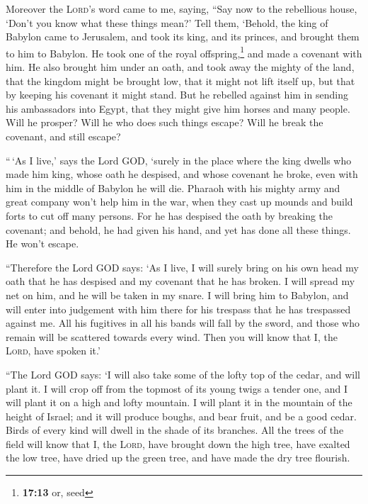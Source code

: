  Moreover the \textsc{Lord}'s word came to me, saying,
 ``Say now to the rebellious house, `Don't you know what
these things mean?' Tell them, `Behold, the king of Babylon came to
Jerusalem, and took its king, and its princes, and brought them to him
to Babylon.  He took one of the royal
offspring,\footnote{\textbf{17:13} or, seed} and made a covenant with
him. He also brought him under an oath, and took away the mighty of the
land,  that the kingdom might be brought low, that it
might not lift itself up, but that by keeping his covenant it might
stand.  But he rebelled against him in sending his
ambassadors into Egypt, that they might give him horses and many people.
Will he prosper? Will he who does such things escape? Will he break the
covenant, and still escape?

 ``\,`As I live,' says the Lord GOD, `surely in the place
where the king dwells who made him king, whose oath he despised, and
whose covenant he broke, even with him in the middle of Babylon he will
die.  Pharaoh with his mighty army and great company
won't help him in the war, when they cast up mounds and build forts to
cut off many persons.  For he has despised the oath by
breaking the covenant; and behold, he had given his hand, and yet has
done all these things. He won't escape.

 ``Therefore the Lord GOD says: `As I live, I will surely
bring on his own head my oath that he has despised and my covenant that
he has broken.  I will spread my net on him, and he will
be taken in my snare. I will bring him to Babylon, and will enter into
judgement with him there for his trespass that he has trespassed against
me.  All his fugitives in all his bands will fall by the
sword, and those who remain will be scattered towards every wind. Then
you will know that I, the \textsc{Lord}, have spoken it.'

 ``The Lord GOD says: `I will also take some of the lofty
top of the cedar, and will plant it. I will crop off from the topmost of
its young twigs a tender one, and I will plant it on a high and lofty
mountain.  I will plant it in the mountain of the height
of Israel; and it will produce boughs, and bear fruit, and be a good
cedar. Birds of every kind will dwell in the shade of its branches.
 All the trees of the field will know that I, the
\textsc{Lord}, have brought down the high tree, have exalted the low
tree, have dried up the green tree, and have made the dry tree flourish.

